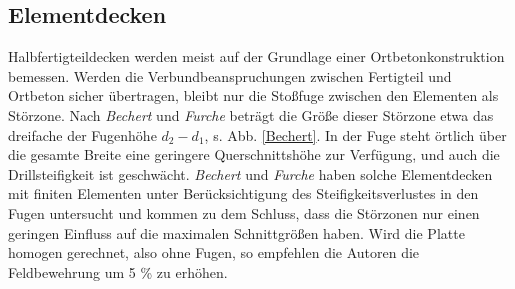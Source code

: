 {\textcolor{sectionTitleBlue}{\subsection{Elementdecken}}}
Halbfertigteildecken werden meist auf der Grundlage einer Ortbetonkonstruktion bemessen. Werden die Verbundbeanspruchungen zwischen Fertigteil und Ortbeton sicher \"{u}bertragen, bleibt nur die Sto{\ss}fuge zwischen den Elementen als St\"{o}rzone. Nach {\em Bechert\/} und {\em Furche\/} \cite{Bechert} betr\"{a}gt die Gr\"{o}{\ss}e dieser St\"{o}rzone etwa das dreifache der Fugenh\"{o}he $d_2 - d_1$, s. Abb. \ref{Bechert}. In der Fuge steht \"{o}rtlich \"{u}ber die gesamte Breite eine geringere Querschnittsh\"{o}he zur Verf\"{u}gung, und auch die Drillsteifigkeit ist geschw\"{a}cht. {\em Bechert\/} und {\em Furche\/} haben solche Elementdecken mit finiten Elementen unter Ber\"{u}cksichtigung des Steifigkeitsverlustes in den Fugen untersucht und kommen zu dem Schluss, dass die St\"{o}rzonen nur einen geringen Einfluss auf die maximalen Schnittgr\"{o}{\ss}en haben. Wird die Platte homogen gerechnet, also ohne  Fugen, so empfehlen die Autoren die Feldbewehrung um 5 \% zu erh\"{o}hen.


